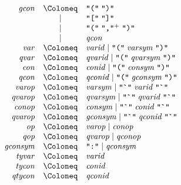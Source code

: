 \begin{align*}
  \begin{array}{rcl}
    \mathit{gcon}
    & \Coloneq & \text{\texttt{\textquotedbl(\textquotedbl}}\; \text{\texttt{\textquotedbl)\textquotedbl}} \\
    & \mid & \text{\texttt{\textquotedbl[\textquotedbl}}\; \text{\texttt{\textquotedbl]\textquotedbl}} \\
    & \mid & \text{\texttt{\textquotedbl(\textquotedbl}}\; \text{\texttt{\textquotedbl,\textquotedbl}}^+\; \text{\texttt{\textquotedbl)\textquotedbl}} \\
    & \mid & \mathit{qcon} \\
    \mathit{var}
    & \Coloneq & \mathit{varid} \mid \text{\texttt{\textquotedbl(\textquotedbl}}\; \mathit{varsym}\; \text{\texttt{\textquotedbl)\textquotedbl}} \\
    \mathit{qvar}
    & \Coloneq & \mathit{qvarid} \mid \text{\texttt{\textquotedbl(\textquotedbl}}\; \mathit{qvarsym}\; \text{\texttt{\textquotedbl)\textquotedbl}} \\
    \mathit{con}
    & \Coloneq & \mathit{conid} \mid \text{\texttt{\textquotedbl(\textquotedbl}}\; \mathit{consym}\; \text{\texttt{\textquotedbl)\textquotedbl}} \\
    \mathit{qcon}
    & \Coloneq & \mathit{qconid} \mid \text{\texttt{\textquotedbl(\textquotedbl}}\; \mathit{gconsym}\; \text{\texttt{\textquotedbl)\textquotedbl}} \\
    \mathit{varop}
    & \Coloneq & \mathit{varsym} \mid \text{\texttt{\textquotedbl\textasciigrave\textquotedbl}}\; \mathit{varid}\; \text{\texttt{\textquotedbl\textasciigrave\textquotedbl}} \\
    \mathit{qvarop}
    & \Coloneq & \mathit{qvarsym} \mid \text{\texttt{\textquotedbl\textasciigrave\textquotedbl}}\; \mathit{qvarid}\; \text{\texttt{\textquotedbl\textasciigrave\textquotedbl}} \\
    \mathit{conop}
    & \Coloneq & \mathit{consym} \mid \text{\texttt{\textquotedbl\textasciigrave\textquotedbl}}\; \mathit{conid}\; \text{\texttt{\textquotedbl\textasciigrave\textquotedbl}} \\
    \mathit{qvarop}
    & \Coloneq & \mathit{gconsym} \mid \text{\texttt{\textquotedbl\textasciigrave\textquotedbl}}\; \mathit{qconid}\; \text{\texttt{\textquotedbl\textasciigrave\textquotedbl}} \\
    \mathit{op}
    & \Coloneq & \mathit{varop} \mid \mathit{conop} \\
    \mathit{qop}
    & \Coloneq & \mathit{qvarop} \mid \mathit{qconop} \\
    \mathit{gconsym}
    & \Coloneq & \text{\texttt{\textquotedbl :\textquotedbl}} \mid \mathit{qconsym} \\
    \mathit{tyvar}
    & \Coloneq & \mathit{varid} \\
    \mathit{tycon}
    & \Coloneq & \mathit{conid} \\
    \mathit{qtycon}
    & \Coloneq & \mathit{qconid}
  \end{array}
\end{align*}

